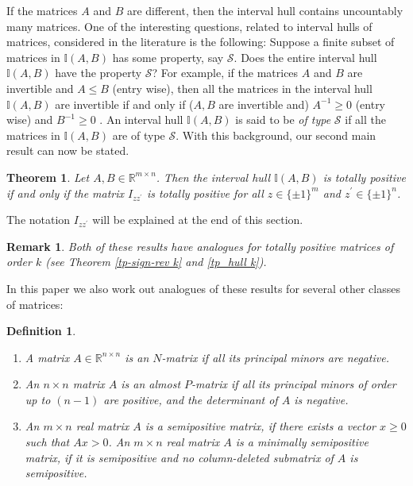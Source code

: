 \documentclass[11pt]{article}
\newtheorem{defn}{Definition}[section]
\newtheorem{rem}{Remark}[section]
\newtheorem{utheorem}{\textrm{\textbf{Theorem}}}
\begin{document}
If the matrices $A$ and $B$ are different, then the interval hull
contains uncountably many matrices. One of the interesting questions,
related to interval hulls of matrices, considered in the literature is
the following:  Suppose a finite subset of matrices in $\mathbb{I}(A, B)$
has some property, say $\mathcal{S}$. Does the entire interval hull
$\mathbb{I}(A, B)$ have the property $\mathcal{S}$?  For example, if the
matrices $A$ and $B$ are invertible and $A \leq B$ (entry wise), then all
the matrices in the interval hull $\mathbb{I}(A, B)$ are invertible if
and only if ($A,B$ are invertible and) $A^{-1} \geq 0$ (entry wise) and
$B^{-1} \geq 0$ \cite{rohn-inv-pos}. An interval hull $\mathbb{I}(A, B)$ is said to be
\textit{of type} $\mathcal{S}$ if all the matrices in $\mathbb{I}(A,
B)$ are of type $\mathcal{S}$. With this background, our second main
result can now be stated.
\begin{utheorem}\label{tp_hull}
	Let $A, B \in \mathbb{R}^{m \times n}$. Then the interval hull $\mathbb{I}(A, B)$ is  totally positive if and only if the matrix $I_{z z^{'}}$ is totally positive for all $z\in \{ \pm 1 \}^m$ and $z^{\prime}\in \{ \pm 1 \}^n$.
\end{utheorem}
The notation $I_{z z^{'}}$ will be explained at the end of this section.
\begin{rem}
	Both of these results have analogues for totally positive matrices of order $k$ (see Theorem \ref{tp-sign-rev k} and \ref{tp_hull k}).
\end{rem}
In this paper we also work out analogues of  these results for several other classes of matrices:
\begin{defn}\label{maindefn}
	
	\begin{enumerate}
		\item A matrix $A \in \mathbb{R}^{n \times n}$ is   \emph{an $N$-matrix} if all its principal minors are negative.
		\item An $n \times n$ matrix $A$ is \emph{an almost $P$-matrix} if all its principal minors of order up to $(n-1)$ are positive, and the determinant of $A$ is negative.
		\item  An $m \times n$ real matrix $A$ is a  \emph{semipositive matrix},  if there exists a vector $x \geq 0$ such that $Ax > 0$. An $m \times n$ real matrix $A$ is a  \emph{minimally semipositive matrix}, if it is semipositive and no column-deleted submatrix of $A$ is semipositive.
	\end{enumerate}
		
\end{defn}
\end{document}
